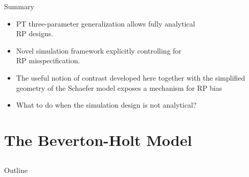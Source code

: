 \documentclass[ xcolor = pdftex, dvipsnames, table ]{beamer}
\begin{document}

%
\begin{frame}{Summary}
\begin{itemize}
\setlength\itemsep{1em}
	\item PT three-parameter generalization allows fully analytical \\RP designs.
	\item Novel simulation framework explicitly controlling for \\RP misspecification. %
	\item The useful notion of contrast developed here together with the simplified geometry of the 
	Schaefer model exposes a mechanism for RP bias
	\item What to do when the simulation design is not analytical?
\end{itemize}
\end{frame}

%
\section{The Beverton-Holt Model}
\subsection{}
\begin{frame}{Outline}
\end{frame}
\end{document}
